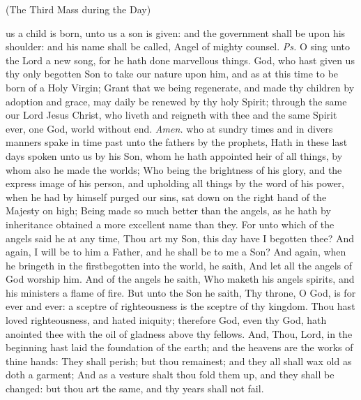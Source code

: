 \label{NativityMassIII}
\centerline{\small{(The Third Mass during the Day)}}
\introit
{} us a child is born, unto us a son is given: and the government shall be upon his shoulder: and his name shall be called, Angel of mighty counsel. \textit{Ps.} O sing unto the Lord a new song, for he hath done marvellous things.
\collect
{} God, who hast given us thy only begotten Son to take our nature upon him, and as at this time to be born of a Holy Virgin; Grant that we being regenerate, and made thy children by adoption and grace, may daily be renewed by thy holy Spirit; through the same our Lord Jesus Christ, who liveth and reigneth with thee and the same Spirit ever, one God, world without end. \textit{Amen.}
 who at sundry times and in divers manners spake in time past unto the fathers by the prophets, Hath in these last days spoken unto us by his Son, whom he hath appointed heir of all things, by whom also he made the worlds; Who being the brightness of his glory, and the express image of his person, and upholding all things by the word of his power, when he had by himself purged our sins, sat down on the right hand of the Majesty on high; Being made so much better than the angels, as he hath by inheritance obtained a more excellent name than they. For unto which of the angels said he at any time, Thou art my Son, this day have I begotten thee? And again, I will be to him a Father, and he shall be to me a Son? And again, when he bringeth in the firstbegotten into the world, he saith, And let all the angels of God worship him. And of the angels he saith, Who maketh his angels spirits, and his ministers a flame of fire. But unto the Son he saith, Thy throne, O God, is for ever and ever: a sceptre of righteousness is the sceptre of thy kingdom. Thou hast loved righteousness, and hated iniquity; therefore God, even thy God, hath anointed thee with the oil of gladness above thy fellows. And, Thou, Lord, in the beginning hast laid the foundation of the earth; and the heavens are the works of thine hands: They shall perish; but thou remainest; and they all shall wax old as doth a garment; And as a vesture shalt thou fold them up, and they shall be changed: but thou art the same, and thy years shall not fail.
